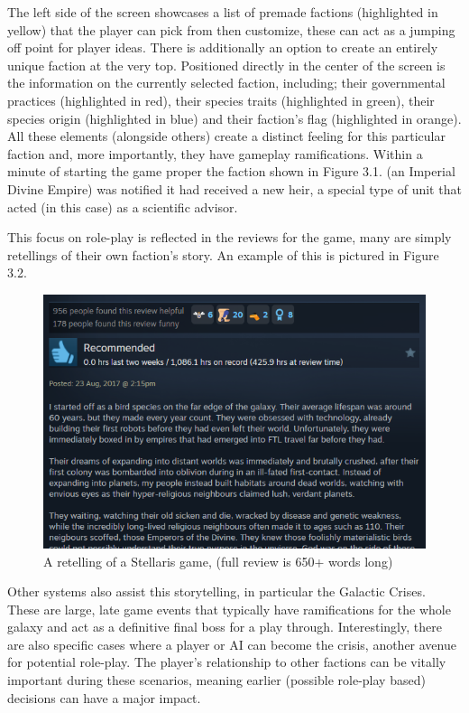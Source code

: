 \documentclass{report}
\begin{document}
The left side of the screen showcases a list of premade factions (highlighted in yellow) that the player can pick from then customize, these can act as a  jumping off point for player ideas. There is additionally an option to create an entirely unique faction at the very top. 
Positioned directly in the center of the screen is the information on the currently selected faction, including; their governmental practices (highlighted in red), their species traits (highlighted in green), their species origin (highlighted in blue) and their faction's flag (highlighted in orange). All these elements (alongside others) create a distinct feeling for this particular faction and, more importantly, they have gameplay ramifications. Within a minute of starting the game proper the faction shown in Figure 3.1. (an Imperial Divine Empire) was notified it had received a new heir, a special type of unit that acted (in this case) as a scientific advisor.

This focus on role-play is reflected in the reviews for the game, many are simply retellings of their own faction's story. An example of this is pictured in Figure 3.2.

\begin{figure}[H]
    \includegraphics[width=\textwidth]{stellaris_positive_review.png}
    \caption{A retelling of a Stellaris game, (full review is 650+ words long)}
\end{figure}

Other systems also assist this storytelling, in particular the Galactic Crises. These are large, late game events that typically have ramifications for the whole galaxy and act as a definitive final boss for a play through. Interestingly, there are also specific cases where a player or AI can become the crisis, another avenue for potential role-play. The player's relationship to other factions can be vitally important during these scenarios, meaning earlier (possible role-play based) decisions can have a major impact.
\end{document}
